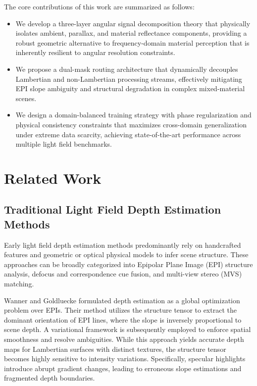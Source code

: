 \documentclass[lettersize,journal]{IEEEtran}
\begin{document}
The core contributions of this work are summarized as follows:
\begin{itemize}
\item We develop a three-layer angular signal decomposition theory that physically isolates ambient, parallax, and material reflectance components, providing a robust geometric alternative to frequency-domain material perception that is inherently resilient to angular resolution constraints.
\item We propose a dual-mask routing architecture that dynamically decouples Lambertian and non-Lambertian processing streams, effectively mitigating EPI slope ambiguity and structural degradation in complex mixed-material scenes.
\item We design a domain-balanced training strategy with phase regularization and physical consistency constraints that maximizes cross-domain generalization under extreme data scarcity, achieving state-of-the-art performance across multiple light field benchmarks.
\end{itemize}

\section{Related Work}

\subsection{Traditional Light Field Depth Estimation Methods}

Early light field depth estimation methods predominantly rely on handcrafted features and geometric or optical physical models to infer scene structure. These approaches can be broadly categorized into Epipolar Plane Image (EPI) structure analysis, defocus and correspondence cue fusion, and multi-view stereo (MVS) matching.

Wanner and Goldluecke \cite{wanner2014} formulated depth estimation as a global optimization problem over EPIs. Their method utilizes the structure tensor to extract the dominant orientation of EPI lines, where the slope is inversely proportional to scene depth. A variational framework is subsequently employed to enforce spatial smoothness and resolve ambiguities. While this approach yields accurate depth maps for Lambertian surfaces with distinct textures, the structure tensor becomes highly sensitive to intensity variations. Specifically, specular highlights introduce abrupt gradient changes, leading to erroneous slope estimations and fragmented depth boundaries.
\end{document}

